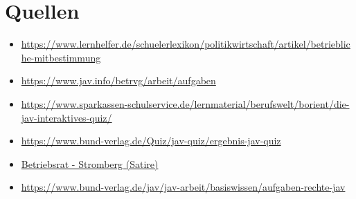 \documentclass[
  a4paper,            %
  DIV=10,             %
  oneside,            %
  BCOR=5mm,           %
  parskip=half,       %
  numbers=noenddot    %
]{scrartcl}
\begin{document}
\section{Quellen}
\begin{itemize}
	\item 
	\url{https://www.lernhelfer.de/schuelerlexikon/politikwirtschaft/artikel/betriebliche-mitbestimmung }
	\item 
	\url{https://www.jav.info/betrvg/arbeit/aufgaben}
	\item
	\url{https://www.sparkassen-schulservice.de/lernmaterial/berufswelt/borient/die-jav-interaktives-quiz/}
	\item 
	\url{https://www.bund-verlag.de/Quiz/jav-quiz/ergebnis-jav-quiz}
	\item
	\href{https://youtu.be/GS_Ea9SezAs}{Betriebsrat - Stromberg (Satire)}
	\item 
	\url{https://www.bund-verlag.de/jav/jav-arbeit/basiswissen/aufgaben-rechte-jav}
\end{itemize}

%
%

\clearpage
\end{document}
